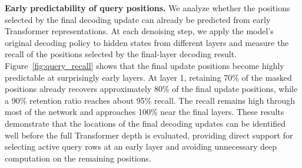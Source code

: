 \textbf{Early predictability of query positions.}
\label{sec:analysis_query}
We analyze whether the positions selected by the final decoding update can already be predicted from early Transformer representations. At each denoising step, we apply the model's original decoding policy to hidden states from different layers and measure the recall of the positions selected by the final-layer decoding result. Figure~\ref{fig:query_recall} shows that the final update positions become highly predictable at surprisingly early layers. At layer 1, retaining 70\% of the masked positions already recovers approximately 80\% of the final update positions, while a 90\% retention ratio reaches about 95\% recall. The recall remains high through most of the network and approaches 100\% near the final layers. These results demonstrate that the locations of the final decoding updates can be identified well before the full Transformer depth is evaluated, providing direct support for selecting active query rows at an early layer and avoiding unnecessary deep computation on the remaining positions.



